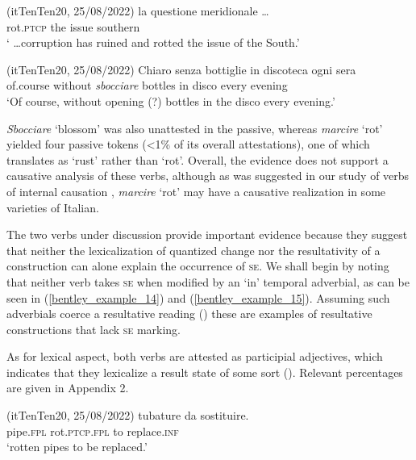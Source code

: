 \documentclass[output=paper,colorlinks,citecolor=brown
]{langscibook}
\begin{document}
\hspace*{\fill}(itTenTen20, 25/08/2022)\quad
\ea \label{bentley_example_16}
     	la			questione	meridionale \ldots   \\
    {} rot.\textsc{ptcp}		the		issue					southern \\
    \glt ‘ \ldots  corruption has ruined and rotted the issue of the South.’
\z


\hspace*{\fill}(itTenTen20, 25/08/2022)\quad
\ea \label{bentley_example_17}
    \gll Chiaro 			senza			 bottiglie	in	discoteca		ogni		sera  \\
 of.course		without	\textit{sbocciare}	bottles			in disco					every evening \\
    \glt ‘Of course, without opening (?) bottles in the disco every evening.’
\z

\textit{Sbocciare} ‘blossom’ was also unattested in the passive, whereas \textit{marcire} ‘rot’ yielded four passive tokens (<1\% of its overall attestations), one of which translates as ‘rust’ rather than ‘rot’. Overall, the evidence does not support a causative analysis of these verbs, although as was suggested in our study of verbs of internal causation \citep{bentley2023internally}, \textit{marcire} ‘rot’ may have a causative realization in some varieties of Italian.

The two verbs under discussion provide important evidence because they suggest that neither the lexicalization of quantized change nor the resultativity of a construction can alone explain the occurrence of \textsc{se}. We shall begin by noting that neither verb takes \textsc{se} when modified by an ‘in’ temporal adverbial, as can be seen in (\ref{bentley_example_14}) and (\ref{bentley_example_15}). Assuming such adverbials coerce a resultative reading (\cites[332—336]{dowty1979word}{hay1999scalar}) these are examples of resultative constructions that lack \textsc{se} marking.

As for lexical aspect, both verbs are attested as participial adjectives, which indicates that they lexicalize a result state of some sort (\cites[]{hout2004unaccusativity}[355]{bentley2006split}[283—284]{legendre2017auxiliaries}). Relevant percentages are given in Appendix 2.

\hspace*{\fill}(itTenTen20, 25/08/2022)\quad
\ea \label{bentley_example_18}
    \gll tubature							da 	sostituire.   \\
    pipe.\textsc{fpl}	rot.\textsc{ptcp}.\textsc{fpl}	to		replace.\textsc{inf}		 \\
    \glt ‘rotten pipes to be replaced.’
\z
\end{document}
